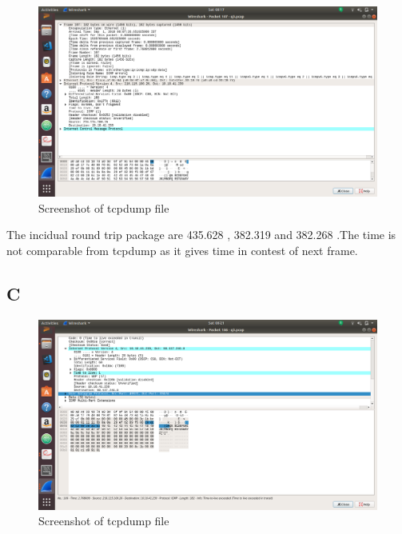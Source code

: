 \documentclass{article}
\begin{document}
    \begin{figure}[H]
 \centering
 \includegraphics[width=1.0\textwidth]{Assign3/q3/q32c.png}
 \caption{\label{fig:PING}Screenshot of tcpdump file}
 \end{figure}
 
 The incidual round trip package are 435.628 , 382.319 and 382.268 .The time is not comparable from tcpdump as it gives time in contest of next frame.
\subsection{C}

  \begin{figure}[H]
 \centering
 \includegraphics[width=1.0\textwidth]{Assign3/q3/q33a.png}
 \caption{\label{fig:PING}Screenshot of tcpdump file}
 \end{figure}
 
\end{document}

